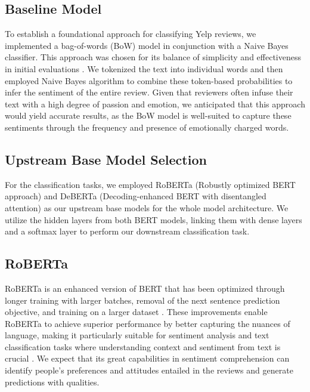 \documentclass[11pt]{article}
\begin{document}
\subsection{Baseline Model}
To establish a foundational approach for classifying Yelp reviews, we implemented a bag-of-words (BoW) model in conjunction with a Naive Bayes classifier. This approach was chosen for its balance of simplicity and effectiveness in initial evaluations \citep{rish2001empirical}. We tokenized the text into individual words and then employed Naive Bayes algorithm to combine these token-based probabilities to infer the sentiment of the entire review. Given that reviewers often infuse their text with a high degree of passion and emotion, we anticipated that this approach would yield accurate results, as the BoW model is well-suited to capture these sentiments through the frequency and presence of emotionally charged words.

\subsection{Upstream Base Model Selection}
For the classification tasks, we employed RoBERTa (Robustly optimized BERT approach) and DeBERTa (Decoding-enhanced BERT with disentangled attention) as our upstream base models for the whole model architecture. We utilize the hidden layers from both BERT models, linking them with dense layers and a softmax layer to perform our downstream classification task. 

\subsection{RoBERTa}
RoBERTa is an enhanced version of BERT that has been optimized through longer training with larger batches, removal of the next sentence prediction objective, and training on a larger dataset \citep{liu2012sentiment}. These improvements enable RoBERTa to achieve superior performance by better capturing the nuances of language, making it particularly suitable for sentiment analysis and text classification tasks where understanding context and sentiment from text is crucial \citep{liu2012sentiment}. We expect that its great capabilities in sentiment comprehension can identify people’s preferences and attitudes entailed in the reviews and generate predictions with qualities.
\end{document}

